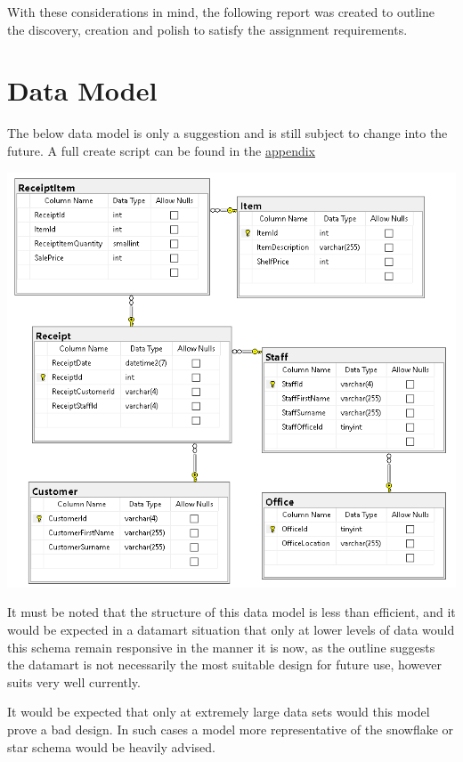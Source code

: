 \documentclass{article}
\begin{document}
    With these considerations in mind, the following report was created to outline
    the discovery, creation and polish to satisfy the assignment requirements.





    \newpage
    \section{Data Model}
    The below data model is only a suggestion and is still subject to change into the future. A full create script can be found in the \hyperref[sec:Appendix]{\color{blue}appendix}
        \begin{center}
            \includegraphics[width=\textwidth,keepaspectratio]{Images/schema.PNG}
        \end{center}
    It must be noted that the structure of this data model is 
    less than efficient, and it would be expected in a datamart
    situation that only at lower levels of data would this schema
    remain responsive in the manner it is now, as the outline
    suggests the datamart is not necessarily the most suitable
    design for future use, however suits very well currently.
    \par
    It would be expected that only at extremely large data sets
    would this model prove a bad design. In such cases a model 
    more representative of the snowflake or star schema would be
    heavily advised.
\end{document}

